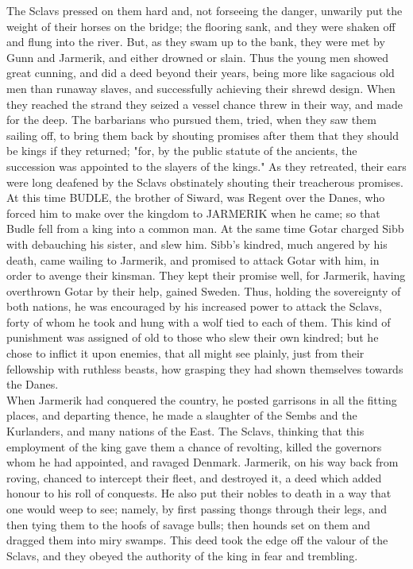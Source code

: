 \documentclass[10pt,a4paper]{report}
\begin{document}
The Sclavs pressed on them hard and, not forseeing the danger, unwarily put the weight of their horses on the bridge; the flooring sank, and they were shaken off and flung into the river. But, as they swam up to the bank, they were met by Gunn and Jarmerik, and either drowned or slain. Thus the young men showed great cunning, and did a deed beyond their years, being more like sagacious old men than runaway slaves, and successfully achieving their shrewd design. When they reached the strand they seized a vessel chance threw in their way, and made for the deep. The barbarians who pursued them, tried, when they saw them sailing off, to bring them back by shouting promises after them that they should be kings if they returned; "for, by the public statute of the ancients, the succession was appointed to the slayers of the kings." As they retreated, their ears were long deafened by the Sclavs obstinately shouting their treacherous promises.\\

At this time BUDLE, the brother of Siward, was Regent over the Danes, who forced him to make over the kingdom to JARMERIK when he came; so that Budle fell from a king into a common man. At the same time Gotar charged Sibb with debauching his sister, and slew him. Sibb's kindred, much angered by his death, came wailing to Jarmerik, and promised to attack Gotar with him, in order to avenge their kinsman. They kept their promise well, for Jarmerik, having overthrown Gotar by their help, gained Sweden. Thus, holding the sovereignty of both nations, he was encouraged by his increased power to attack the Sclavs, forty of whom he took and hung with a wolf tied to each of them. This kind of punishment was assigned of old to those who slew their own kindred; but he chose to inflict it upon enemies, that all might see plainly, just from their fellowship with ruthless beasts, how grasping they had shown themselves towards the Danes.\\

When Jarmerik had conquered the country, he posted garrisons in all the fitting places, and departing thence, he made a slaughter of the Sembs and the Kurlanders, and many nations of the East. The Sclavs, thinking that this employment of the king gave them a chance of revolting, killed the governors whom he had appointed, and ravaged Denmark. Jarmerik, on his way back from roving, chanced to intercept their fleet, and destroyed it, a deed which added honour to his roll of conquests. He also put their nobles to death in a way that one would weep to see; namely, by first passing thongs through their legs, and then tying them to the hoofs of savage bulls; then hounds set on them and dragged them into miry swamps. This deed took the edge off the valour of the Sclavs, and they obeyed the authority of the king in fear and trembling.\\
\end{document}
